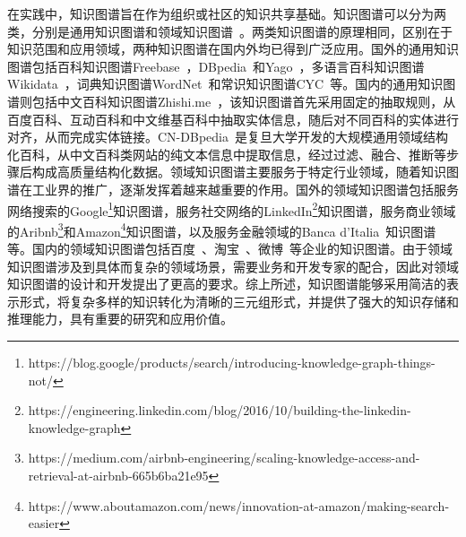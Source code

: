 \documentclass[algorithmlist, AutoFakeBold, AutoFakeSlant, figurelist, tablelist, nomlist, engineering, openany]{seuthesix} %
\begin{document}
在实践中，知识图谱旨在作为组织或社区的知识共享基础。知识图谱可以分为两类，分别是通用知识图谱和领域知识图谱~\cite{hogan2021knowledge}。两类知识图谱的原理相同，区别在于知识范围和应用领域，两种知识图谱在国内外均已得到广泛应用。国外的通用知识图谱包括百科知识图谱Freebase~\cite{bollacker2007platform}，DBpedia~\cite{lehmann2015dbpedia}和Yago~\cite{hoffart2011yago2}，多语言百科知识图谱Wikidata~\cite{vrandevcic2014wikidata}，词典知识图谱WordNet~\cite{miller2007wordnet}和常识知识图谱CYC~\cite{lenat1995cyc}等。国内的通用知识图谱则包括中文百科知识图谱Zhishi.me~\cite{niu2011zhishi}，该知识图谱首先采用固定的抽取规则，从百度百科、互动百科和中文维基百科中抽取实体信息，随后对不同百科的实体进行对齐，从而完成实体链接。CN-DBpedia~\cite{xu2017cn}是复旦大学开发的大规模通用领域结构化百科，从中文百科类网站的纯文本信息中提取信息，经过过滤、融合、推断等步骤后构成高质量结构化数据。领域知识图谱主要服务于特定行业领域，随着知识图谱在工业界的推广，逐渐发挥着越来越重要的作用。国外的领域知识图谱包括服务网络搜索的Google\footnote{https://blog.google/products/search/introducing-knowledge-graph-things-not/}知识图谱，服务社交网络的LinkedIn\footnote{https://engineering.linkedin.com/blog/2016/10/building-the-linkedin-knowledge-graph}知识图谱，服务商业领域的Aribnb\footnote{https://medium.com/airbnb-engineering/scaling-knowledge-access-and-retrieval-at-airbnb-665b6ba21e95}和Amazon\footnote{https://www.aboutamazon.com/news/innovation-at-amazon/making-search-easier}知识图谱，以及服务金融领域的Banca d’Italia~\cite{bellomarini2019knowledge}知识图谱等。国内的领域知识图谱包括百度~\cite{wang2013xlore}、淘宝~\cite{xu2021alime}、微博~\cite{wei2020analysis}等企业的知识图谱。由于领域知识图谱涉及到具体而复杂的领域场景，需要业务和开发专家的配合，因此对领域知识图谱的设计和开发提出了更高的要求。综上所述，知识图谱能够采用简洁的表示形式，将复杂多样的知识转化为清晰的三元组形式，并提供了强大的知识存储和推理能力，具有重要的研究和应用价值。
\end{document}
